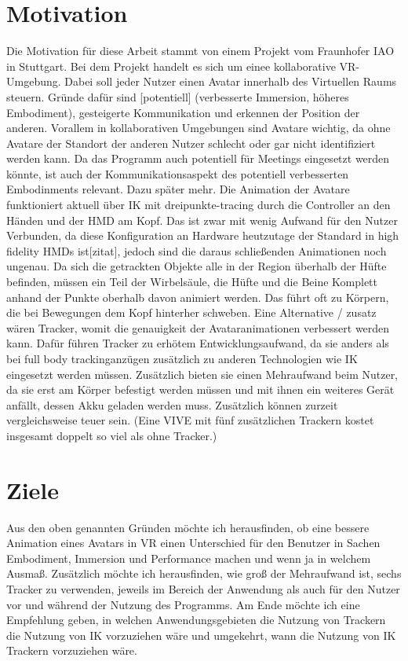 \section{Motivation}
Die Motivation für diese Arbeit stammt von einem Projekt vom Fraunhofer IAO in Stuttgart. Bei dem Projekt handelt es sich um einee kollaborative VR-Umgebung. Dabei soll jeder Nutzer einen Avatar innerhalb des Virtuellen Raums steuern. 
Gründe dafür sind [potentiell] (verbesserte Immersion, höheres Embodiment), gesteigerte Kommunikation und erkennen der Position der anderen.
 Vorallem in kollaborativen Umgebungen sind Avatare wichtig, da ohne Avatare der Standort der anderen Nutzer schlecht oder gar nicht identifiziert werden kann. Da das Programm auch potentiell für Meetings eingesetzt werden könnte, ist auch der Kommunikationsaspekt des potentiell verbesserten Embodinments relevant. Dazu später mehr.
Die Animation der Avatare funktioniert aktuell über IK mit dreipunkte-tracing durch die Controller an den Händen und der HMD am Kopf. Das ist zwar mit wenig Aufwand für den Nutzer Verbunden, da diese Konfiguration an Hardware heutzutage der Standard in high fidelity HMDs ist[zitat], jedoch sind die daraus schließenden Animationen noch ungenau. Da sich die getrackten Objekte alle in der Region überhalb der Hüfte befinden, müssen ein Teil der Wirbelsäule, die Hüfte und die Beine Komplett anhand der Punkte oberhalb davon animiert werden. Das führt oft zu Körpern, die bei Bewegungen dem Kopf hinterher schweben.
Eine Alternative / zusatz wären Tracker, womit die genauigkeit der Avataranimationen verbessert werden kann. Dafür führen Tracker zu erhötem Entwicklungsaufwand, da sie anders als bei full body trackinganzügen zusätzlich zu anderen Technologien wie IK eingesetzt werden müssen. Zusätzlich bieten sie einen Mehraufwand beim Nutzer, da sie erst am Körper befestigt werden müssen und mit ihnen ein weiteres Gerät anfällt, dessen Akku geladen werden muss. Zusätzlich können zurzeit vergleichsweise teuer sein. 
(Eine VIVE mit fünf zusätzlichen Trackern kostet insgesamt doppelt so viel als ohne Tracker.)


\section{Ziele}
Aus den oben genannten Gründen möchte ich herausfinden, ob eine bessere Animation eines Avatars in VR einen Unterschied für den Benutzer in Sachen Embodiment, Immersion und Performance machen und wenn ja in welchem Ausmaß. 
Zusätzlich möchte ich herausfinden, wie groß der Mehraufwand ist, sechs Tracker zu verwenden, jeweils im Bereich der Anwendung als auch für den Nutzer vor und während der Nutzung des Programms.
Am Ende möchte ich eine Empfehlung geben, in welchen Anwendungsgebieten die Nutzung von Trackern die Nutzung von IK vorzuziehen wäre und umgekehrt, wann die Nutzung von IK Trackern vorzuziehen wäre.


